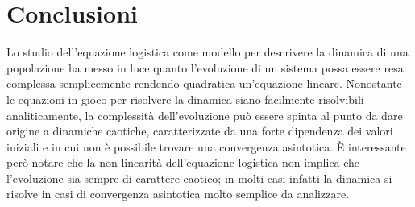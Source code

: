 \section*{Conclusioni}
Lo studio dell'equazione logistica come modello per descrivere la dinamica di una popolazione ha messo in luce quanto l'evoluzione di un sistema possa essere resa complessa semplicemente rendendo quadratica un'equazione lineare. Nonostante le equazioni in gioco per risolvere la dinamica siano facilmente risolvibili analiticamente, la complessità dell'evoluzione può essere spinta al punto da dare origine a dinamiche caotiche, caratterizzate da una forte dipendenza dei valori iniziali e in cui non è possibile trovare una convergenza asintotica. È interessante però notare che la non linearità dell'equazione logistica non implica che l'evoluzione sia sempre di carattere caotico; in molti casi infatti la dinamica si risolve in casi di convergenza asintotica molto semplice da analizzare. 